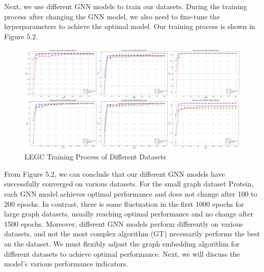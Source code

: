 \documentclass[ %
                    author={Tengyao Tu},
                supervisor={Dr. James Pope},
                    degree={MSc},
                     title={A New Perspective on Graph Community Detection: Combining Traditional Methods with Deep Learning Approaches},
                  subtitle={Applying to Telecom Networks and Diverse Datasets},
                      type={},
                      year={2024}]{dissertation}
\begin{document}
Next, we use different GNN models to train our datasets. During the training process after changing the GNN model, we also need to fine-tune the hyperparameters to achieve the optimal model. Our training process is shown in Figure 5.2.
\begin{figure}[h!] %
    \centering
    \includegraphics[width=1.0\textwidth]{Figure_10.png} %
    \caption{LEGC Training Process of Different Datasets}
    \label{virtual Graph Data Map}
\end{figure}
From Figure 5.2, we can conclude that our different GNN models have successfully converged on various datasets. For the small graph dataset Protein, each GNN model achieves optimal performance and does not change after 100 to 200 epochs. In contrast, there is some fluctuation in the first 1000 epochs for large graph datasets, usually reaching optimal performance and no change after 1500 epochs. Moreover, different GNN models perform differently on various datasets, and not the most complex algorithm (GT) necessarily performs the best on the dataset. We must flexibly adjust the graph embedding algorithm for different datasets to achieve optimal performance. Next, we will discuss the model's various performance indicators.
\end{document}

